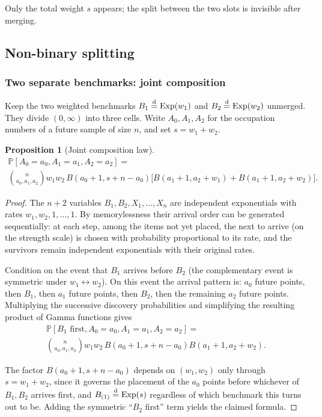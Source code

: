 \documentclass[11pt]{article}
\newcommand{\PP}{\mathbb{P}}
\DeclareMathOperator{\Exp}{Exp}
\theoremstyle{plain}
\newtheorem{proposition}[theorem]{Proposition}
\theoremstyle{definition}
\begin{document}
Only the total weight \(s\) appears; the split between the two slots is invisible after merging.
 


\subsection{Non-binary splitting}
\subsubsection{Two separate benchmarks: joint composition}
\label{sec:two-benchmarks}
 
Keep the two weighted benchmarks \(B_1\stackrel{\rm d}{=}\Exp(w_1)\) and \(B_2\stackrel{\rm d}{=}\Exp(w_2)\) unmerged. They divide \((0,\infty)\) into three cells. Write \(A_0,A_1,A_2\) for the occupation numbers of a future sample of size \(n\), and set \(s=w_1+w_2\).
 
\begin{proposition}[Joint composition law]
\label{thm:joint-two}
\begin{eqnarray*}
\PP[A_0=a_0,A_1=a_1,A_2=a_2]
=\\
\binom{n}{a_0,a_1,a_2}w_1 w_2\,B(a_0+1,s+n-a_0)
\bigl[B(a_1+1,a_2+w_1)+B(a_1+1,a_2+w_2)\bigr].
\end{eqnarray*}
\end{proposition}
 
\begin{proof}
The \(n+2\) variables \(B_1,B_2,X_1,\dots,X_n\) are independent exponentials with rates 
\(w_1,w_2,1,\dots,1\). By memorylessness their arrival order can be generated sequentially: at each step, among the items not yet placed, the next to arrive (on the strength scale) is chosen with probability proportional to its rate, and the survivors remain independent exponentials with their original rates.
 
Condition on the event that \(B_1\) arrives before \(B_2\) (the complementary event is symmetric under \(w_1\leftrightarrow w_2\)). On this event the arrival pattern is: \(a_0\) future points, then \(B_1\), then \(a_1\) future points, then \(B_2\), then the remaining \(a_2\) future points. Multiplying the successive discovery probabilities and simplifying the resulting product of Gamma functions gives
\begin{eqnarray*}
\PP[B_1\text{ first},A_0=a_0,A_1=a_1,A_2=a_2]
=\\
\binom{n}{a_0,a_1,a_2}w_1 w_2\,B(a_0+1,s+n-a_0)B(a_1+1,a_2+w_2).
\end{eqnarray*}
 
The factor \(B(a_0+1,s+n-a_0)\) depends on \((w_1,w_2)\) only through \(s=w_1+w_2\), since it governs the placement of the \(a_0\) points before whichever of \(B_1,B_2\) arrives first, and \(B_{(1)}\stackrel{\rm d}{=}\Exp(s)\) regardless of which benchmark this turns out to be. Adding the symmetric ``\(B_2\) first'' term yields the claimed formula.
\end{proof}
 
\end{document}
